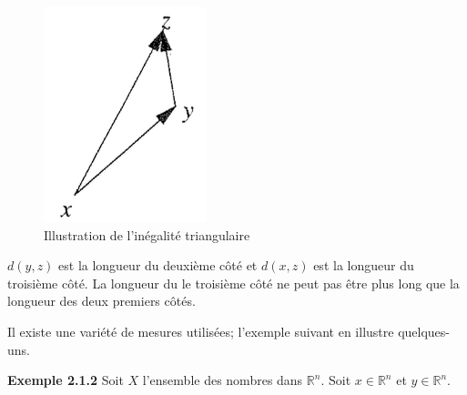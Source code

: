 \documentclass[10pt,twoside,a4paper]{book}
\begin{document}
\begin{figure}[h]
  \centering
  \includegraphics[scale=0.6]{fig2.1}
  \caption{Illustration de l'inégalité triangulaire}
\end{figure}

\noindent
$d(y, z)$ est la longueur du deuxième côté et $d(x, z)$ est la longueur du troisième côté. 
La longueur du le troisième côté ne peut pas être plus long que la longueur des deux premiers côtés.

\vspace{4mm}

Il existe une variété de mesures utilisées; l'exemple suivant en illustre quelques-uns.

\vspace{4mm}
\noindent
\textbf{Exemple 2.1.2} Soit $X$ l'ensemble des nombres dans $\mathbb{R}^n$. Soit $x \in \mathbb{R}^n$ et $y \in \mathbb{R}^n$.
\end{document}
